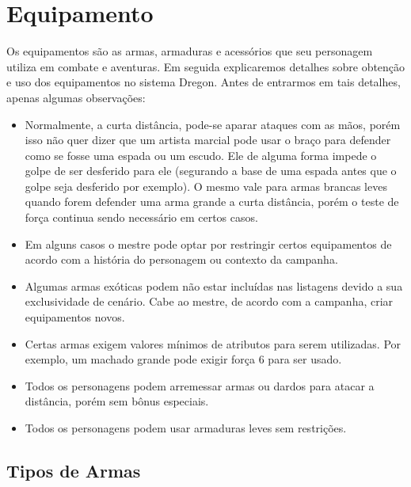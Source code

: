 
\chapter{Equipamento}
\label{Cap:equipamento}

Os equipamentos são as armas, armaduras e acessórios que seu personagem utiliza em combate e aventuras. Em seguida explicaremos detalhes sobre obtenção e uso dos equipamentos no sistema Dregon. Antes de entrarmos em tais detalhes, apenas algumas observações:

\begin{itemize}
	\item Normalmente, a curta distância, pode-se aparar ataques com as mãos, porém isso não quer dizer que um artista marcial pode usar o braço para defender como se fosse uma espada ou um escudo. Ele de alguma forma impede o golpe de ser desferido para ele (segurando a base de uma espada antes que o golpe seja desferido por exemplo). O mesmo vale para armas brancas leves quando forem defender uma arma grande a curta distância, porém o teste de força continua sendo necessário em certos casos.

	\item Em alguns casos o mestre pode optar por restringir certos equipamentos de acordo com a história do personagem ou contexto da campanha. 

	\item Algumas armas exóticas podem não estar incluídas nas listagens devido a sua exclusividade de cenário. Cabe ao mestre, de acordo com a campanha, criar equipamentos novos. 
	
	\item Certas armas exigem valores mínimos de atributos para serem utilizadas. Por exemplo, um machado grande pode exigir força 6 para ser usado.

	\item Todos os personagens podem arremessar armas ou dardos para atacar a distância, porém sem bônus especiais. 

	\item Todos os personagens podem usar armaduras leves sem restrições.

\end{itemize}



\section{Tipos de Armas}

